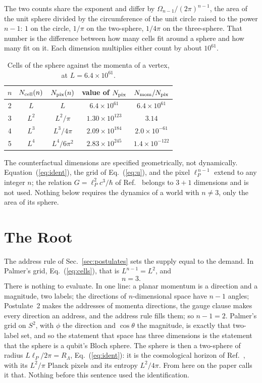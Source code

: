 \documentclass[aps,prd,twocolumn,superscriptaddress,nofootinbib]{revtex4-2}
\begin{document}
The two counts share the exponent and differ by $\Omega_{n-1}/(2\pi)^{n-1}$, the area of the unit sphere divided by the circumference of the unit circle raised to the power $n-1$: $1$ on the circle, $1/\pi$ on the two-sphere, $1/4\pi$ on the three-sphere. That number is the difference between how many cells fit around a sphere and how many fit on it. Each dimension multiplies either count by about $10^{61}$.

\begin{table}[t]
\caption{Cells of the sphere against the momenta of a vertex, at $L = 6.4\times10^{61}$.}
\label{tab:count}
\begin{ruledtabular}
\begin{tabular}{ccccc}
$n$ & $N_{\rm cell}(n)$ & $N_{\rm pix}(n)$ & value of $N_{\rm pix}$ & $N_{\rm mom}/N_{\rm pix}$ \\
\hline
2 & $L$ & $L$ & $6.4\times10^{61}$ & $6.4\times10^{61}$ \\
3 & $L^2$ & $L^2/\pi$ & $1.30\times10^{123}$ & $3.14$ \\
4 & $L^3$ & $L^3/4\pi$ & $2.09\times10^{184}$ & $2.0\times10^{-61}$ \\
5 & $L^4$ & $L^4/6\pi^2$ & $2.83\times10^{245}$ & $1.4\times10^{-122}$ \\
\end{tabular}
\end{ruledtabular}
\end{table}

The counterfactual dimensions are specified geometrically, not dynamically. Equation~(\ref{eq:ident}), the grid of Eq.~(\ref{eq:u}), and the pixel $\ell_P^{\,n-1}$ extend to any integer $n$; the relation $G = \ell_P^2c^3/\hbar$ of Ref.~\cite{korytko2026} belongs to $3+1$ dimensions and is not used. Nothing below requires the dynamics of a world with $n \ne 3$, only the area of its sphere.

\section{The Root}
\label{sec:root}

The address rule of Sec.~\ref{sec:postulates} sets the supply equal to the demand. In Palmer's grid, Eq.~(\ref{eq:cells}), that is $L^{n-1} = L^2$, and
\begin{equation}
n = 3 .
\label{eq:exact}
\end{equation}
There is nothing to evaluate. In one line: a planar momentum is a direction and a magnitude, two labels; the directions of $n$-dimensional space have $n-1$ angles; Postulate~2 makes the addresses of momenta directions, the gauge clause makes every direction an address, and the address rule fills them; so $n-1 = 2$. Palmer's grid on $S^2$, with $\phi$ the direction and $\cos\theta$ the magnitude, is exactly that two-label set, and so the statement that space has three dimensions is the statement that the sphere is a qubit's Bloch sphere. The sphere is then a two-sphere of radius $L\ell_P/2\pi = R_\Lambda$, Eq.~(\ref{eq:ident}): it is the cosmological horizon of Ref.~\cite{korytko2026}, with its $L^2/\pi$ Planck pixels and its entropy $L^2/4\pi$. From here on the paper calls it that. Nothing before this sentence used the identification.
\end{document}
